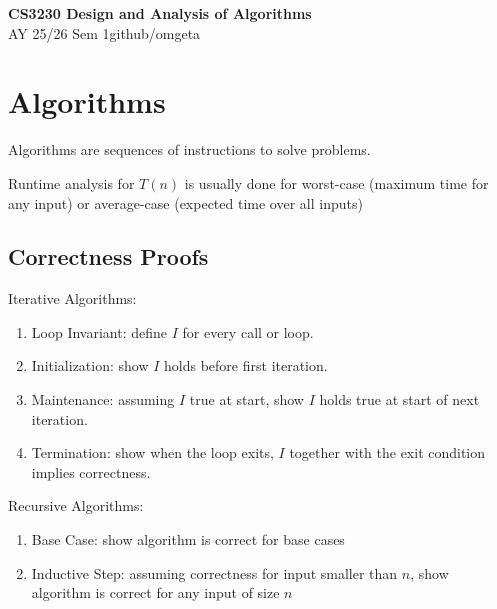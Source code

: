 \documentclass[12pt, a4paper]{article}
\newcommand{\mytitle}{CS3230 Design and Analysis of Algorithms}
\newcommand{\myauthor}{github/omgeta}
\newcommand{\mydate}{AY 25/26 Sem 1}
\begin{document}
\raggedright
\footnotesize
\begin{multicols*}{3}
\setlength{\premulticols}{1pt}
\setlength{\postmulticols}{1pt}
\setlength{\multicolsep}{1pt}
\setlength{\columnsep}{2pt}

{\normalsize{\textbf{\mytitle}}} \\
{\footnotesize{\mydate\hspace{2pt}\textemdash\hspace{2pt}\myauthor}}
\vspace{-0.5em}
\section{Algorithms}

Algorithms are sequences of instructions to solve problems.

Runtime analysis for $T(n)$ is usually done for worst-case (maximum time for any input) or average-case (expected time over all inputs)


\subsection{Correctness Proofs}

Iterative Algorithms:
\begin{enumerate}[\roman*.]
  \item Loop Invariant: define $I$ for every call or loop.
  \item Initialization: show $I$ holds before first iteration.
  \item Maintenance: assuming $I$ true at start, show $I$ holds true at start of next iteration.
  \item Termination: show when the loop exits, $I$ together with the exit condition implies correctness.
\end{enumerate}

Recursive Algorithms:
\begin{enumerate}[\roman*.]
  \item Base Case: show algorithm is correct for base cases
  \item Inductive Step: assuming correctness for input smaller than $n$, show algorithm is correct for any input of size $n$
\end{enumerate}


\end{multicols*}
\end{document}
